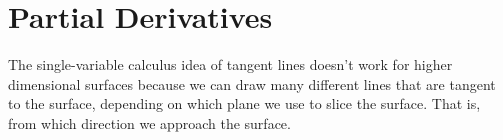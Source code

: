 \section{Partial Derivatives}
\noindent
The single-variable calculus idea of tangent lines doesn't work for higher dimensional surfaces because we can draw many different lines that are tangent to the surface, depending on which plane we use to slice the surface. That is, from which direction we approach the surface.


